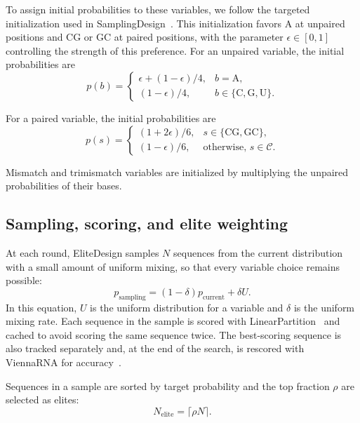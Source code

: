 

To assign initial probabilities to these variables, we follow the targeted initialization used
in SamplingDesign~\citep{tang2026}. This initialization favors A at unpaired positions and CG or GC
at paired positions, with the parameter $\epsilon\in[0,1]$ controlling the strength of this preference.
For an unpaired variable, the initial probabilities are
\begin{equation}
 p(b)=\begin{cases}
 \epsilon+(1-\epsilon)/4,&b=\mathrm{A},\\
 (1-\epsilon)/4,&b\in\{\mathrm{C,G,U}\}.
 \end{cases}
\end{equation}


For a paired variable, the initial probabilities are
\begin{equation}
 p(s)=\begin{cases}
 (1+2\epsilon)/6,&s\in\{\mathrm{CG,GC}\},\\
 (1-\epsilon)/6,&\text{otherwise, }s\in\mathcal{C}.
 \end{cases}
\end{equation}

Mismatch and trimismatch variables are initialized by multiplying the unpaired probabilities of their bases.

\subsection{Sampling, scoring, and elite weighting}

At each round, EliteDesign samples $N$ sequences from the current distribution with a
small amount of uniform mixing, so that every variable choice remains possible:
\begin{equation}
 p_{\mathrm{sampling}}=(1-\delta)p_{\mathrm{current}}+\delta U.
 \label{eq:sampling}
\end{equation}
In this equation, $U$ is the uniform distribution for a variable and $\delta$
is the uniform mixing rate. Each sequence in the sample is scored with
LinearPartition~\citep{zhang2020} and cached to avoid scoring the same sequence twice.
The best-scoring sequence is also tracked separately and, at the end of the
search, is rescored with ViennaRNA for accuracy~\citep{lorenz2011}.

Sequences in a sample are sorted by target probability and the top fraction
$\rho$ are selected as elites:
\begin{equation}
 N_{\mathrm{elite}}=\lceil\rho N\rceil.
\end{equation}

